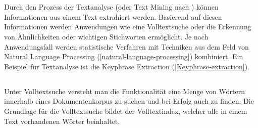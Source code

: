 







\section{}


Durch den Prozess der \gls{Textanalyse} (oder Text Mining nach \cite{tan1999text}) können Informationen aus einem Text extrahiert werden. Basierend auf diesen Informationen werden Anwendungen wie eine \gls{Volltextsuche} oder die Erkennung von Ähnlichkeiten oder wichtigen Stichworten ermöglicht. Je nach Anwendungsfall werden statistische Verfahren mit Techniken aus dem Feld von \gls{Natural Language Processing} (\autoref{natural-language-processing}) kombiniert. Ein Beispiel für \gls{Textanalyse} ist die \gls{Keyphrase Extraction} (\autoref{Keyphrase-extraction}). 



\subsection{}


Unter \gls{Volltextsuche} versteht man die Funktionalität eine Menge von Wörtern innerhalb eines Dokumentenkorpus zu suchen und bei Erfolg auch zu finden. Die Grundlage für die \gls{Volltextsuche} bildet der Volltextindex, welcher alle in einem Text vorhandenen Wörter beinhaltet.

